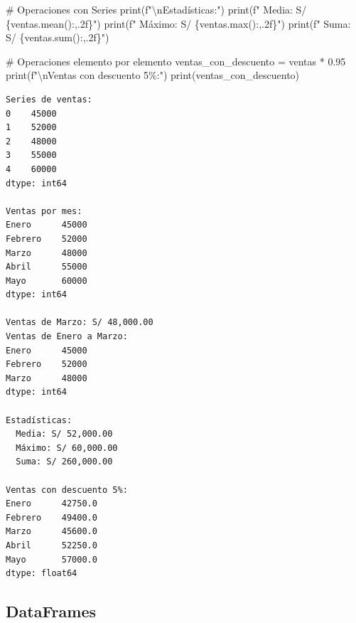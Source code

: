 \documentclass[
  doc,
  floatsintext,
  longtable,
  a4paper,
  nolmodern,
  notxfonts,
  notimes,
  12pt,
  colorlinks=true,linkcolor=blue,citecolor=blue,urlcolor=blue]{apa7}
\newenvironment{Shaded}{\begin{snugshade}}{\end{snugshade}}
\newcommand{\BuiltInTok}[1]{\textcolor[rgb]{0.00,0.23,0.31}{#1}}
\newcommand{\CharTok}[1]{\textcolor[rgb]{0.13,0.47,0.30}{#1}}
\newcommand{\CommentTok}[1]{\textcolor[rgb]{0.37,0.37,0.37}{#1}}
\newcommand{\FloatTok}[1]{\textcolor[rgb]{0.68,0.00,0.00}{#1}}
\newcommand{\NormalTok}[1]{\textcolor[rgb]{0.00,0.23,0.31}{#1}}
\newcommand{\OperatorTok}[1]{\textcolor[rgb]{0.37,0.37,0.37}{#1}}
\newcommand{\SpecialCharTok}[1]{\textcolor[rgb]{0.37,0.37,0.37}{#1}}
\newcommand{\SpecialStringTok}[1]{\textcolor[rgb]{0.13,0.47,0.30}{#1}}
\begin{document}
\begin{Shaded}
\begin{Highlighting}[]
\CommentTok{\# Operaciones con Series}
\BuiltInTok{print}\NormalTok{(}\SpecialStringTok{f"}\CharTok{\textbackslash{}n}\SpecialStringTok{Estadísticas:"}\NormalTok{)}
\BuiltInTok{print}\NormalTok{(}\SpecialStringTok{f"  Media: S/ }\SpecialCharTok{\{}\NormalTok{ventas}\SpecialCharTok{.}\NormalTok{mean()}\SpecialCharTok{:,.2f\}}\SpecialStringTok{"}\NormalTok{)}
\BuiltInTok{print}\NormalTok{(}\SpecialStringTok{f"  Máximo: S/ }\SpecialCharTok{\{}\NormalTok{ventas}\SpecialCharTok{.}\BuiltInTok{max}\NormalTok{()}\SpecialCharTok{:,.2f\}}\SpecialStringTok{"}\NormalTok{)}
\BuiltInTok{print}\NormalTok{(}\SpecialStringTok{f"  Suma: S/ }\SpecialCharTok{\{}\NormalTok{ventas}\SpecialCharTok{.}\BuiltInTok{sum}\NormalTok{()}\SpecialCharTok{:,.2f\}}\SpecialStringTok{"}\NormalTok{)}

\CommentTok{\# Operaciones elemento por elemento}
\NormalTok{ventas\_con\_descuento }\OperatorTok{=}\NormalTok{ ventas }\OperatorTok{*} \FloatTok{0.95}
\BuiltInTok{print}\NormalTok{(}\SpecialStringTok{f"}\CharTok{\textbackslash{}n}\SpecialStringTok{Ventas con descuento 5\%:"}\NormalTok{)}
\BuiltInTok{print}\NormalTok{(ventas\_con\_descuento)}
\end{Highlighting}
\end{Shaded}

\begin{verbatim}
Series de ventas:
0    45000
1    52000
2    48000
3    55000
4    60000
dtype: int64

Ventas por mes:
Enero      45000
Febrero    52000
Marzo      48000
Abril      55000
Mayo       60000
dtype: int64

Ventas de Marzo: S/ 48,000.00
Ventas de Enero a Marzo:
Enero      45000
Febrero    52000
Marzo      48000
dtype: int64

Estadísticas:
  Media: S/ 52,000.00
  Máximo: S/ 60,000.00
  Suma: S/ 260,000.00

Ventas con descuento 5%:
Enero      42750.0
Febrero    49400.0
Marzo      45600.0
Abril      52250.0
Mayo       57000.0
dtype: float64
\end{verbatim}

\subsection{DataFrames}\label{dataframes}
\end{document}
